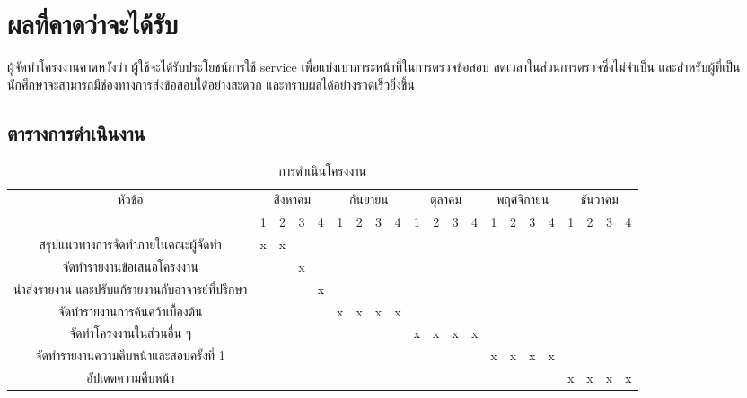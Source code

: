 \section{ผลที่คาดว่าจะได้รับ}
ผู้จัดทำโครงงานคาดหวังว่า ผู้ใช้จะได้รับประโยชน์การใช้ service เพื่อแบ่งเบาภาระ\mbox{หน้าที่}ในการตรวจข้อสอบ ลดเวลาในส่วนการตรวจซึ่งไม่จำเป็น และสำหรับผู้ที่เป็นนักศึกษาจะสามารถมีช่องทางการส่งข้อสอบได้อย่างสะดวก และทราบผลได้อย่างรวดเร็วยิ่งขึ้น
\begin{landscape}

\section{ตารางการดำเนินงาน}

    \begin{table}[h]
        \centering
        
        \begin{tabular}{|*{21}{c|}}
        \hline 
        \multirow {2}{*}{หัวข้อ} & \multicolumn{4}{c|}{สิงหาคม} & \multicolumn{4}{c|}{กันยายน} & \multicolumn{4}{c|}{ตุลาคม} & \multicolumn{4}{c|}{พฤศจิกายน} & \multicolumn{4}{c|}{ธันวาคม} \\\cline {2-21}
        & 1 & 2 & 3 & 4 & 1 & 2 & 3 & 4 &  1 & 2 & 3 & 4 & 1 & 2 & 3 & 4 & 1 & 2 & 3 & 4  \\\hline 
         สรุปแนวทางการจัดทำภายในคณะผู้จัดทำ & x & x &  &  &  &  &  &  &  &  &  &  &    &  &  &  &  &  &  &  \\\hline 
         จัดทำรายงานข้อเสนอโครงงาน &  &  & x &  &  &  &  &  &  &  &  &  &  &  &  &  &  &  &  &    \\\hline 
         นำส่งรายงาน และปรับแก้รายงานกับอาจารย์ที่ปรึกษา &  &  &  & x  &  &  &  &  &  &  &  &  &  &  &  &  &  &  &  &  \\\hline 
         จัดทำรายงานการค้นคว้าเบื้องต้น &  &  &  &  & x & x  & x  & x  &  &  &  &  &  &  &  &  &  &  &  & \\\hline 
        จัดทำโครงงานในส่วนอื่น ๆ &  &  &  &  &  &  &  &  & x & x & x & x &  &  &  &  &  &  &  &   \\\hline 
        จัดทำรายงานความคืบหน้าและสอบครั้งที่ 1 &  &  &  &  &  &  &  &  &  &  &  &  & x & x & x & x &  &  &  &   \\\hline 
         อัปเดตความคืบหน้า &  &  &  &  &  &  &  &  &  &  &  &  &  &  &  &  & x & x & x & x  \\\hline 
        
        \end{tabular}
        \caption{การดำเนินโครงงาน}
        \label{tab:my_label}
        \vspace{0.5em}
    

\end{table}
\end{landscape}
